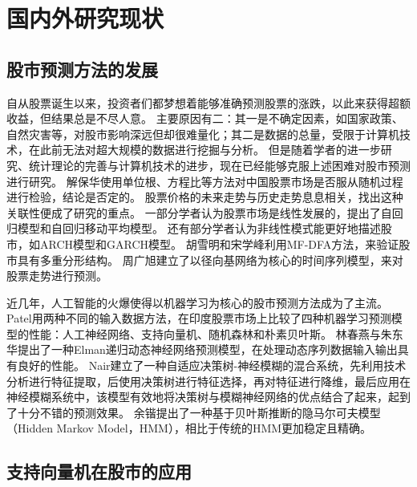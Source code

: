 \section{国内外研究现状}

\subsection{股市预测方法的发展}

自从股票诞生以来，投资者们都梦想着能够准确预测股票的涨跌，以此来获得超额收益，但结果总是不尽人意。
主要原因有二：其一是不确定因素，如国家政策\cite{cn5}、自然灾害等，对股市影响深远但却很难量化；其二是数据的总量，受限于计算机技术，在此前无法对超大规模的数据进行挖掘与分析。
但是随着学者的进一步研究、统计理论的完善与计算机技术的进步，现在已经能够克服上述困难对股市预测进行研究。
解保华使用单位根、方程比等方法对中国股票市场是否服从随机过程进行检验，结论是否定的\cite{cn6}。
股票价格的未来走势与历史走势息息相关，找出这种关联性便成了研究的重点。
一部分学者认为股票市场是线性发展的，提出了自回归模型\cite{cn7}和自回归移动平均模型\cite{cn8}。
还有部分学者认为非线性模式能更好地描述股市，如ARCH模型\cite{cn9}和GARCH模型\cite{cn10}。
胡雪明和宋学峰利用MF-DFA方法，来验证股市具有多重分形结构\cite{cn11}。
周广旭建立了以径向基网络为核心的时间序列模型，来对股票走势进行预测\cite{cn12}。

近几年，人工智能的火爆使得以机器学习为核心的股市预测方法成为了主流\cite{cn13}。
Patel用两种不同的输入数据方法，在印度股票市场上比较了四种机器学习预测模型的性能：人工神经网络、支持向量机、随机森林和朴素贝叶斯\cite{en2}。
林春燕与朱东华提出了一种Elman递归动态神经网络预测模型，在处理动态序列数据输入输出具有良好的性能\cite{cn14}。
Nair建立了一种自适应决策树-神经模糊的混合系统，先利用技术分析进行特征提取，后使用决策树进行特征选择，再对特征进行降维，最后应用在神经模糊系统中，该模型有效地将决策树与模糊神经网络的优点结合了起来，起到了十分不错的预测效果\cite{en3}。
余锴提出了一种基于贝叶斯推断的隐马尔可夫模型（Hidden Markov Model，HMM），相比于传统的HMM更加稳定且精确\cite{cn15}。

\subsection{支持向量机在股市的应用}

